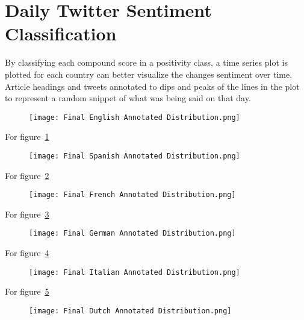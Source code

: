 \section{Daily Twitter Sentiment Classification}

By classifying each compound score in a positivity class, a time series plot is plotted for each country can better visualize the changes sentiment over time.
Article headings and tweets annotated to dips and peaks of the lines in the plot to represent a random snippet of what was being said on that day.

\begin{figure}[h!]
\texttt{[image: Final English Annotated Distribution.png]}
\caption[English Annotated Sentiment Distribution]{ }
\label{fig:English}
\end{figure}

\noindent For figure~\ref{fig:English}

\begin{figure}[h!]
\texttt{[image: Final Spanish Annotated Distribution.png]}
\caption[English Annotated Sentiment Distribution]{ }
\label{fig:Spanish}
\end{figure}

\noindent For figure~\ref{fig:Spanish}

\begin{figure}[h!]
\texttt{[image: Final French Annotated Distribution.png]}
\caption[Final French Annotated Distribution]{ }
\label{fig:French}
\end{figure}

\noindent For figure~\ref{fig:French}

\begin{figure}[h!]
\texttt{[image: Final German Annotated Distribution.png]}
\caption[Final German Annotated Distribution]{ }
\label{fig:German}
\end{figure}

\noindent For figure~\ref{fig:German}

\begin{figure}[h!]
\texttt{[image: Final Italian Annotated Distribution.png]}
\caption[Final Italian Annotated Distribution]{ }
\label{fig:Italian}
\end{figure}

\noindent For figure~\ref{fig:Italian}

\begin{figure}[h!]
\texttt{[image: Final Dutch Annotated Distribution.png]}
\caption[Final Dutch Annotated Distribution]{ }
\label{fig:Dutch}
\end{figure}

